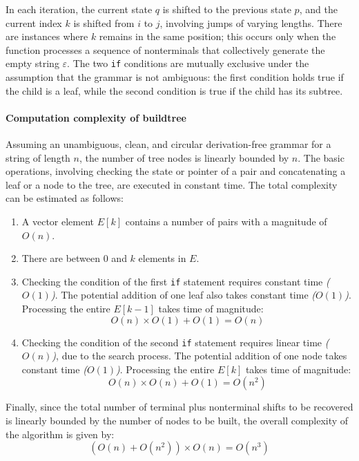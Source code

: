 In each iteration, the current state $q$ is shifted to the previous state $p$, and the current index $k$ is shifted from $i$ to $j$, involving jumps of varying lengths. There are instances where $k$ remains in the same position; this occurs only when the function processes a sequence of nonterminals that collectively generate the empty string $\varepsilon$.
The two \texttt{if} conditions are mutually exclusive under the assumption that the grammar is not ambiguous: the first condition holds true if the child is a leaf, while the second condition is true if the child has its subtree.

\paragraph*{Computation complexity of buildtree}
Assuming an unambiguous, clean, and circular derivation-free grammar for a string of length $n$, the number of tree nodes is linearly bounded by $n$. 
The basic operations, involving checking the state or pointer of a pair and concatenating a leaf or a node to the tree, are executed in constant time.
The total complexity can be estimated as follows:
\begin{enumerate}
    \item A vector element $E[k]$ contains a number of pairs with a magnitude of $O(n)$.
    \item There are between $0$ and $k$ elements in $E$.
    \item Checking the condition of the first \texttt{if} statement requires constant time \textit{($O(1)$)}. 
        The potential addition of one leaf also takes constant time \textit{($O(1)$)}. 
        Processing the entire $E[k-1]$ takes time of magnitude:
        \[ O(n) \times O(1) + O(1) = O(n) \]
    \item Checking the condition of the second \texttt{if} statement requires linear time \textit{($O(n)$)}, due to the search process. 
        The potential addition of one node takes constant time \textit{($O(1)$)}. 
        Processing the entire $E[k]$ takes time of magnitude: 
        \[ O(n) \times O(n) + O(1) = O\left( n^2 \right)  \]
\end{enumerate}
Finally, since the total number of terminal plus nonterminal shifts to be recovered is linearly bounded by the number of nodes to be built, the overall complexity of the algorithm is given by:
\[\left( O(n) + O\left( n^2 \right) \right) \times O(n) = O\left( n^3 \right) \]

